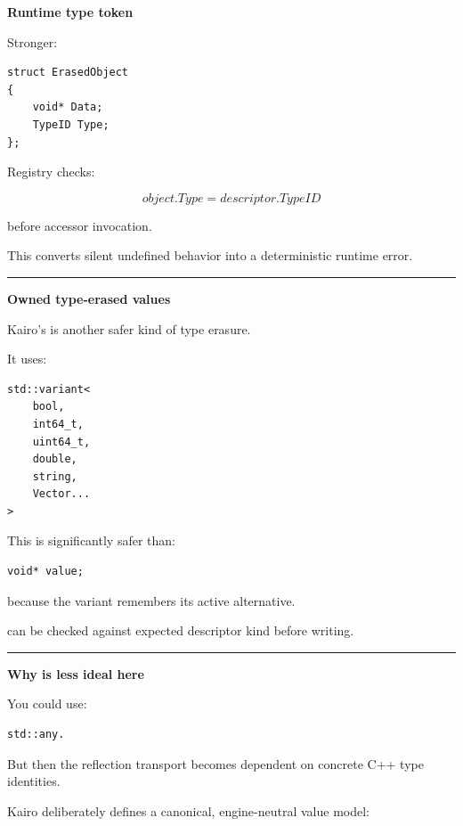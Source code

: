 \textbf{Runtime type token}

Stronger:

\begin{verbatim}
struct ErasedObject
{
    void* Data;
    TypeID Type;
};
\end{verbatim}

Registry checks:

\[
object.Type=
descriptor.TypeID
\]

before accessor invocation.

This converts silent undefined behavior into a deterministic runtime error.

\begin{center}\rule{0.5\linewidth}{0.5pt}\end{center}

\textbf{Owned type-erased values}

Kairo's  is another safer kind of type erasure.

It uses:

\begin{verbatim}
std::variant<
    bool,
    int64_t,
    uint64_t,
    double,
    string,
    Vector...
>
\end{verbatim}

This is significantly safer than:

\begin{verbatim}
void* value;
\end{verbatim}

because the variant remembers its active alternative.

 can be checked against expected descriptor kind before writing.

\begin{center}\rule{0.5\linewidth}{0.5pt}\end{center}

\textbf{Why  is less ideal here}

You could use:

\begin{verbatim}
std::any.
\end{verbatim}

But then the reflection transport becomes dependent on concrete C++ type identities.

Kairo deliberately defines a canonical, engine-neutral value model:

